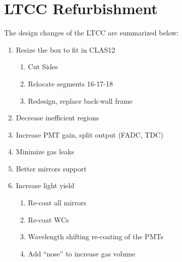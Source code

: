 \section{LTCC Refurbishment}

The design changes of the LTCC are summarized below:

\begin{enumerate}
	\item Resize the box to fit in CLAS12
	\begin{enumerate}
		\item Cut Sides
		\item Relocate segments 16-17-18
		\item Redesign, replace back-wall frame
	\end{enumerate}

	\item Decrease inefficient regions
	\item Increase PMT gain, split output (FADC, TDC)
	\item Minimize gas leaks
	\item Better mirrors support
	\item Increase light yield
	\begin{enumerate}
		\item Re-coat all mirrors
		\item Re-coat WCs
		\item Wavelength shifting re-coating of the PMTs
		\item Add “nose” to increase gas volume
	\end{enumerate}
\end{enumerate}







